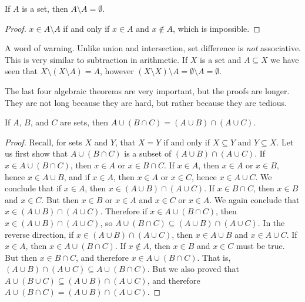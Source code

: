             \begin{theorem}
                If $A$ is a set, then $A\setminus{A}=\emptyset$.
            \end{theorem}
            \begin{proof}
                $x\in{A}\setminus{A}$ if and only if $x\in{A}$ and
                $x\notin{A}$, which is impossible.
            \end{proof}
            A word of warning. Unlike union and intersection, set difference
            is \textit{not} associative. This is very similar to subtraction
            in arithmetic. If $X$ is a set and $A\subseteq{X}$ we have seen
            that $X\setminus(X\setminus{A})=A$, however
            $(X\setminus{X})\setminus{A}=\emptyset\setminus{A}=\emptyset$.
            \par\hfill\par
            The last four algebraic theorems are very important, but the proofs
            are longer. They are not long because they are hard, but rather
            because they are tedious.
            \begin{theorem}
                If $A$, $B$, and $C$ are sets, then
                $A\cup(B\cap{C})=(A\cup{B})\cap(A\cup{C})$.
            \end{theorem}
            \begin{proof}
                Recall, for sets $X$ and $Y$, that $X=Y$ if and only if
                $X\subseteq{Y}$ and $Y\subseteq{X}$. Let us first show that
                $A\cup(B\cap{C})$ is a subset of
                $(A\cup{B})\cap(A\cup{C})$. If $x\in{A}\cup(B\cap{C})$, then
                $x\in{A}$ or $x\in{B}\cap{C}$. If $x\in{A}$, then
                $x\in{A}$ or $x\in{B}$, hence $x\in{A}\cup{B}$, and if
                $x\in{A}$, then $x\in{A}$ or $x\in{C}$, hence
                $x\in{A}\cup{C}$. We conclude that if $x\in{A}$, then
                $x\in(A\cup{B})\cap(A\cup{C})$. If $x\in{B}\cap{C}$, then
                $x\in{B}$ and $x\in{C}$. But then
                $x\in{B}$ or $x\in{A}$ and $x\in{C}$ or $x\in{A}$. We again
                conclude that $x\in(A\cup{B})\cap(A\cup{C})$. Therefore if
                $x\in{A}\cup(B\cap{C})$, then
                $x\in(A\cup{B})\cap(A\cup{C})$, so
                $A\cup(B\cap{C})\subseteq(A\cup{B})\cap(A\cup{C})$. In the
                reverse direction, if $x\in(A\cup{B})\cap(A\cup{C})$, then
                $x\in{A}\cup{B}$ and $x\in{A}\cup{C}$. If $x\in{A}$,
                then $x\in{A}\cup(B\cap{C})$. If $x\notin{A}$, then
                $x\in{B}$ and $x\in{C}$ must be true. But then
                $x\in{B}\cap{C}$, and therefore $x\in{A}\cup(B\cap{C})$.
                That is, $(A\cup{B})\cap(A\cup{C})\subseteq{A}\cup(B\cap{C})$.
                But we also proved that
                $A\cup(B\cup{C})\subseteq(A\cup{B})\cap(A\cup{C})$,
                and therefore $A\cup(B\cap{C})=(A\cup{B})\cap(A\cup{C})$.
            \end{proof}
